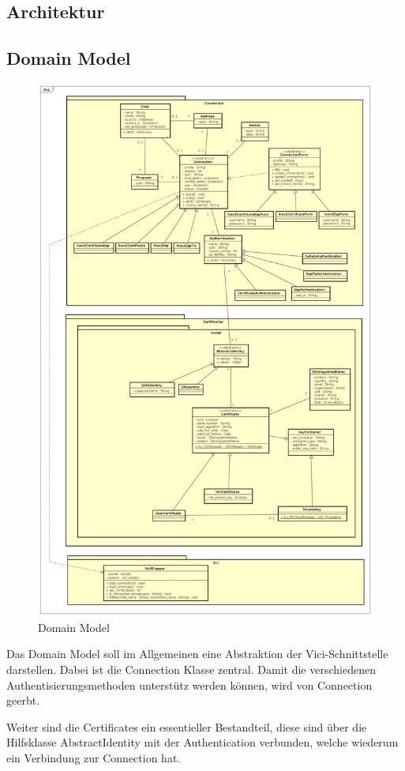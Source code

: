 \subsection{Architektur}

\subsection{Domain Model}

\begin{figure}[H]
\centering
\includegraphics[width=420pt]{images/domain_model_strongman.png}
\caption[Domain Model]{Domain Model}
\end{figure}

Das Domain Model soll im Allgemeinen eine Abstraktion der Vici-Schnittstelle darstellen.
Dabei ist die Connection Klasse zentral. Damit die verschiedenen Authentisierungsmethoden unterstütz werden können, wird von Connection geerbt.

Weiter sind die Certificates ein essentieller Bestandteil, diese sind über die Hilfsklasse AbstractIdentity mit der Authentication verbunden, welche wiederum ein Verbindung zur Connection hat.

\newpage